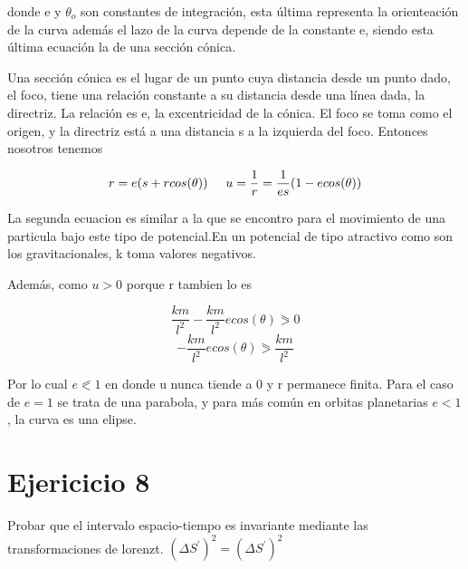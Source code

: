 \documentclass[12 pt]{article}
\begin{document}
donde e y $\theta_{o}$ son constantes de integración, esta última representa la orienteación de la curva además el  lazo de la curva depende de la constante e, siendo esta última ecuación la de una sección cónica.


Una sección cónica es el lugar de un punto cuya distancia desde un punto dado, el foco, tiene una relación constante a su distancia desde una línea dada, la directriz. La relación es e, la excentricidad de la cónica. El foco se toma como el origen, y la directriz está a una distancia s a la izquierda del foco. Entonces nosotros tenemos

\begin{equation*}
r = e(s +r cos(\theta)) \hspace{0.5cm} u = \frac{1}{r}= \frac{1}{es}(1- e cos(\theta))
\end{equation*}


La segunda ecuacion es similar a la que se encontro para el movimiento de una particula bajo este tipo de potencial.En un potencial de tipo atractivo como son los gravitacionales, k toma valores negativos.


Además, como $u >0$ porque r tambien lo es


\begin{equation*}
\frac{km}{l^{2}} -\frac{km}{l^{2}} e cos(\theta) \eqslantgtr 0
\end{equation*}
\begin{equation*}
-\frac{km}{l^{2}}e cos(\theta)\eqslantgtr \frac{km}{l^{2}}
\end{equation*}




Por lo cual $e \eqslantless 1$ en donde  u nunca tiende a 0 y r permanece finita. Para el caso de $e=1$ se trata de una parabola, y para más común en orbitas planetarias $e<1$, la curva es una elipse.



















\section*{Ejericicio 8}
Probar que el intervalo espacio-tiempo es invariante mediante las transformaciones de lorenzt.
 $(\Delta S ^{'})^{2} = (\Delta S^{'})^{2}$
\end{document}

